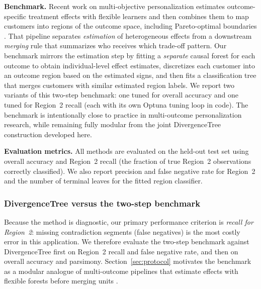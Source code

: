 \documentclass[11pt,letterpaper,english]{article}
\theoremstyle{definition}
\theoremstyle{definition}
\begin{document}
\begin{bibunit}
\vspace{6pt}
\noindent
\textbf{Benchmark.}
Recent work on multi-objective personalization estimates outcome-specific treatment effects with flexible learners and then combines them to map customers into regions of the outcome space, including Pareto-optimal boundaries \citep{rafieian2025multiobjective}. That pipeline separates \emph{estimation} of heterogeneous effects from a downstream \emph{merging} rule that summarizes who receives which trade-off pattern. Our benchmark mirrors the estimation step by fitting a \emph{separate} causal forest for each outcome to obtain individual-level effect estimates, discretizes each customer into an outcome region based on the estimated signs, and then fits a classification tree that merges customers with similar estimated region labels. We report two variants of this two-step benchmark: one tuned for overall accuracy and one tuned for Region~2 recall (each with its own Optuna tuning loop in code). The benchmark is intentionally close to practice in multi-outcome personalization research, while remaining fully modular from the joint DivergenceTree construction developed here.

\vspace{6pt}
\noindent
\textbf{Evaluation metrics.}
All methods are evaluated on the held-out test set using overall accuracy and Region~2 recall (the fraction of true Region~2 observations correctly classified). We also report precision and false negative rate for Region~2 and the number of terminal leaves for the fitted region classifier.

\subsubsection{DivergenceTree versus the two-step benchmark}
\label{sec:results}
\label{sec:results-twostep}

Because the method is diagnostic, our primary performance criterion is \emph{recall for Region~2}: missing contradiction segments (false negatives) is the most costly error in this application. We therefore evaluate the two-step benchmark against DivergenceTree first on Region~2 recall and false negative rate, and then on overall accuracy and parsimony. Section~\ref{sec:protocol} motivates the benchmark as a modular analogue of multi-outcome pipelines that estimate effects with flexible forests before merging units \citep{rafieian2025multiobjective}.




\end{bibunit}
\end{document}
